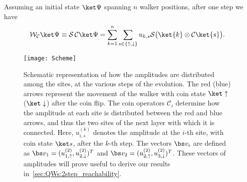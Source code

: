 Assuming an initial state $\ket\Psi$ spanning $n$ walker positions, after one step we have
\begin{equation}
	\mathcal W_{\mathcal C} \ket\Psi \equiv
	\mathcal S \,\mathcal C \ket\Psi
	= \sum_{k=1}^n \sum_{s\in\{\uparrow,\downarrow\}}
	u_{k,s}
	\mathcal S \big( \ket{k} \otimes \mathcal C \ket{s} \big).
	\label{eq:QWs:step_operator_definition}
\end{equation}

\begin{figure}[tb]
\center
\texttt{[image: Scheme]}
\caption{
    Schematic representation of how the amplitudes are distributed among the sites, at the various steps of the evolution.
    The red (blue) arrows represent the movement of the walker with coin state $\ket\uparrow$ ($\ket\downarrow$) after the coin flip.
    The coin operators $\mathcal C_i$ determine how the amplitude at each site is distributed between the red and blue arrows, and thus the two sites of the next layer with which it is connected.
    Here, $u_{i,s}^{(k)}$ denotes the amplitude at the $i$-th site, with coin state $\ket s$, after the $k$-th step.
    The vectors $\bs v_i$ are defined as
    $\bs v_1=(u_{1,\uparrow}^{(2)},u_{2,\downarrow}^{(2)})^T$ and
    $\bs v_2=(u_{2,\uparrow}^{(2)},u_{3,\downarrow}^{(2)})^T$.
    These vectors of amplitudes will prove useful to derive our results in~\cref{sec:QWs:2step_reachability}.
}
\label{fig:QWs:conceptual_scheme_walker}
\end{figure}

